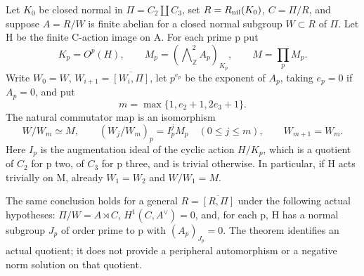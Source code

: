 Let \(K_0\) be closed normal in \(\Pi=C_2\amalg C_3\), set
\(R=R_{\rm nil}(K_0)\), \(C=\Pi/R\), and suppose
\(A=R/W\) is finite abelian for a closed normal subgroup
\(W\subset R\) of \(\Pi\). Let H be the finite C-action image
on A. For each prime p put
\[
 K_p=O^p(H),\qquad
 M_p=\left(\mathop{\bigwedge}\nolimits^2_{\mathbb Z} A_p\right)_{K_p},
 \qquad M=\prod_p M_p.
 \tag{A.58.1}
\]
Write \(W_0=W\), \(W_{i+1}=\overline{[W_i,\Pi]}\), let
\(p^{e_p}\) be the exponent of \(A_p\), taking \(e_p=0\) if
\(A_p=0\), and put
\[
 m=\max\{1,e_2+1,2e_3+1\}.
 \tag{A.58.2}
\]
The natural commutator map is an isomorphism
\[
 W/W_m\simeq M,
 \qquad (W_j/W_m)_p=I_p^jM_p\quad(0\leq j\leq m),
 \qquad W_{m+1}=W_m.
 \tag{A.58.3}
\]
Here \(I_p\) is the augmentation ideal of the cyclic action
\(H/K_p\), which is a quotient of \(C_2\) for p two, of
\(C_3\) for p three, and is trivial otherwise. In particular, if
H acts trivially on M, already \(W_1=W_2\) and \(W/W_1=M\).

The same conclusion holds for a general
\(R=\overline{[R,\Pi]}\) under the following actual hypotheses:
\(\Pi/W=A\rtimes C\), \(H^1(C,A^\vee)=0\), and, for each p,
H has a normal subgroup \(J_p\) of order prime to p with
\((A_p)_{J_p}=0\). The theorem identifies an actual quotient;
it does not provide a peripheral automorphism or a negative norm
solution on that quotient.

